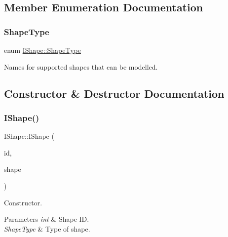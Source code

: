 \subsection{Member Enumeration Documentation}
\mbox{\label{class_i_shape_a8f50993477b5ddb44c0547ef3d547cdc}} 
\subsubsection{\texorpdfstring{ShapeType}{ShapeType}}
{\footnotesize\ttfamily enum \mbox{\hyperlink{class_i_shape_a8f50993477b5ddb44c0547ef3d547cdc}{I\+Shape\+::\+Shape\+Type}}\hspace{0.3cm}{\ttfamily [strong]}}



Names for supported shapes that can be modelled. 



\subsection{Constructor \& Destructor Documentation}
\mbox{\label{class_i_shape_a236c00619f1fa2eaab6c4ce85a2375aa}} 
\subsubsection{\texorpdfstring{IShape()}{IShape()}\hspace{0.1cm}{\footnotesize\ttfamily [1/2]}}
{\footnotesize\ttfamily I\+Shape\+::\+I\+Shape (\begin{DoxyParamCaption}\item[{int}]{id,  }\item[{\mbox{\hyperlink{class_i_shape_a8f50993477b5ddb44c0547ef3d547cdc}{Shape\+Type}}}]{shape }\end{DoxyParamCaption})}



Constructor. 


\begin{DoxyParams}{Parameters}
{\em int} & Shape ID. \\
\hline
{\em Shape\+Type} & Type of shape. \\
\hline
\end{DoxyParams}
\mbox{\label{class_i_shape_a0671306e1665998f9c6652cf1ef1a74e}} 
